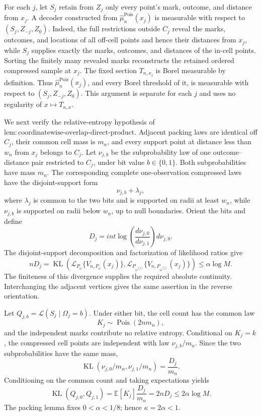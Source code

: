 For each \(j\), let \(S_j\) retain from \(Z_j\) only every point's mark, outcome, and distance from \(x_j\).  A decoder constructed from \(\widehat\mu_n^{\mathrm{Pois}}(x_j)\) is measurable with respect to \((S_j,Z_{-j},Z_0)\).  Indeed, the full restrictions outside \(C_j\) reveal the marks, outcomes, and locations of all off-cell points and hence their distances from \(x_j\), while \(S_j\) supplies exactly the marks, outcomes, and distances of the in-cell points.  Sorting the finitely many revealed marks reconstructs the retained ordered compressed sample at \(x_j\).  The fixed section \(T_{n,x_j}\) is Borel measurable by definition.  Thus \(\widehat\mu_n^{\mathrm{Pois}}(x_j)\), and every Borel threshold of it, is measurable with respect to \((S_j,Z_{-j},Z_0)\).  This argument is separate for each \(j\) and uses no regularity of \(x\mapsto T_{n,x}\).

We next verify the relative-entropy hypothesis of \(\mathrm{lem:coordinatewise\text{-}overlap\text{-}direct\text{-}product}\).  Adjacent packing laws are identical off \(C_j\), their common cell mass is \(m_n\), and every support point at distance less than \(w_n\) from \(x_j\) belongs to \(C_j\).  Let \(\nu_{j,b}\) be the subprobability law of one outcome--distance pair restricted to \(C_j\), under bit value \(b\in\{0,1\}\).  Both subprobabilities have mass \(m_n\).  The corresponding complete one-observation compressed laws have the disjoint-support form
\[
 \nu_{j,b}+\lambda_j,
\]
where \(\lambda_j\) is common to the two bits and is supported on radii at least \(w_n\), while \(\nu_{j,b}\) is supported on radii below \(w_n\), up to null boundaries.  Orient the bits and define
\[
 D_j=int\log\!\left(\frac{d\nu_{j,0}}{d\nu_{j,1}}\right)d\nu_{j,0}.
\]
The disjoint-support decomposition and factorization of likelihood ratios give
\[
 nD_j
 =\operatorname{KL}\!\left(
 \mathcal L_{P_\omega}\{V_{n,P_\omega}(x_j)\},
 \mathcal L_{P_{\omega^{(j)}}}\{V_{n,P_{\omega^{(j)}}}(x_j)\}
 \right)
 \leq\alpha\log M.
\]
The finiteness of this divergence supplies the required absolute continuity.  Interchanging the adjacent vertices gives the same assertion in the reverse orientation.

Let \(Q_{j,b}=\mathcal L(S_j\mid\Omega_j=b)\).  Under either bit, the cell count has the common law
\[
 K_j\sim\operatorname{Pois}(2nm_n),
\]
and the independent marks contribute no relative entropy.  Conditional on \(K_j=k\), the compressed cell points are independent with law \(\nu_{j,b}/m_n\).  Since the two subprobabilities have the same mass,
\[
 \operatorname{KL}(\nu_{j,0}/m_n,\nu_{j,1}/m_n)
 =\frac{D_j}{m_n}.
\]
Conditioning on the common count and taking expectations yields
\[
 \operatorname{KL}(Q_{j,0},Q_{j,1})
 =\mathbb E[K_j]\frac{D_j}{m_n}
 =2nD_j
 \leq2\alpha\log M.
\]
The packing lemma fixes \(0<\alpha<1/8\); hence \(\kappa=2\alpha<1\).

